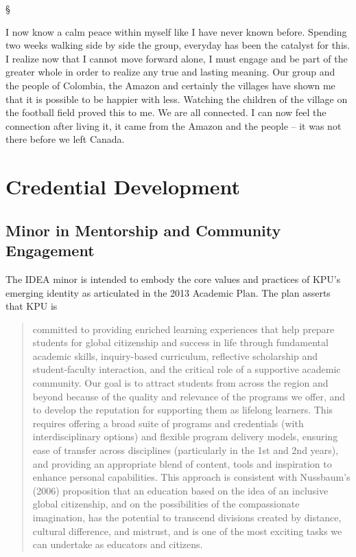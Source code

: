 \documentclass[letterpaper,10pt,headsepline]{scrreprt}
\begin{document}
\begin{center}§\end{center}

I now know a calm peace within myself like I have never known before.
Spending two weeks walking side by side the group, everyday has been the
catalyst for this. I realize now that I cannot move forward alone, I
must engage and be part of the greater whole in order to realize any
true and lasting meaning. Our group and the people of Colombia, the
Amazon and certainly the villages have shown me that it is possible to
be happier with less. Watching the children of the village on the
football field proved this to me. We are all connected. I can now feel
the connection after living it, it came from the Amazon and the people
-- it was not there before we left Canada.

\chapter{Credential Development}

\section{Minor in Mentorship and Community Engagement}

The IDEA minor is intended to embody the core values and practices of
KPU's emerging identity as articulated in the 2013 Academic Plan. The
plan asserts that KPU is

\begin{quote}
committed to providing enriched learning experiences that help prepare
students for global citizenship and success in life through fundamental
academic skills, inquiry-based curriculum, reflective scholarship and
student-faculty interaction, and the critical role of a supportive
academic community. Our goal is to attract students from across the
region and beyond because of the quality and relevance of the programs
we offer, and to develop the reputation for supporting them as lifelong
learners. This requires offering a broad suite of programs and
credentials (with interdisciplinary options) and flexible program
delivery models, ensuring ease of transfer across disciplines
(particularly in the 1st and 2nd years), and providing an appropriate
blend of content, tools and inspiration to enhance personal
capabilities. This approach is consistent with Nussbaum's (2006)
proposition that an education based on the idea of an inclusive global
citizenship, and on the possibilities of the compassionate imagination,
has the potential to transcend divisions created by distance, cultural
difference, and mistrust, and is one of the most exciting tasks we can
undertake as educators and citizens.
\end{quote}
\end{document}
